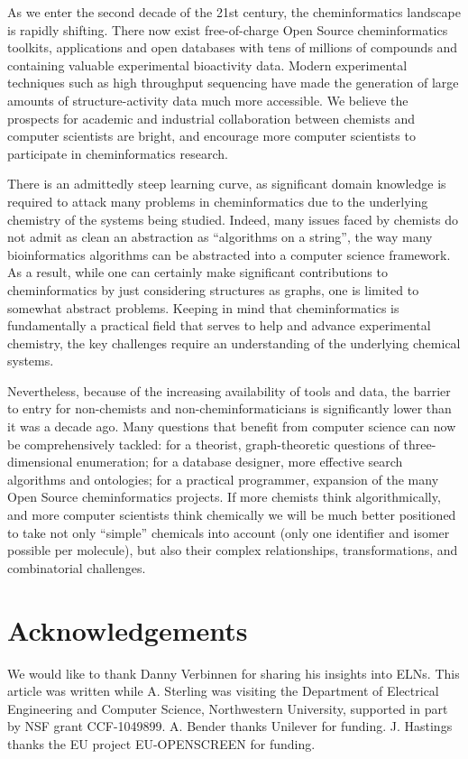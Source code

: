 \documentclass{sig-alternate}
\begin{document}
As we enter the second decade of the 21st century, the cheminformatics
landscape is rapidly shifting.  There now exist free-of-charge Open
Source cheminformatics toolkits, applications and open databases with
tens of millions of compounds and containing valuable experimental
bioactivity data. Modern experimental techniques such as high
throughput sequencing have made the generation of large amounts of
structure-activity data much more accessible.  We believe the
prospects for academic and industrial collaboration between chemists
and computer scientists are bright, and encourage more computer
scientists to participate in cheminformatics research.

There is an admittedly steep learning curve, as significant domain
knowledge is required to attack many problems in cheminformatics due
to the underlying chemistry of the systems being studied. Indeed, many
issues faced by chemists do not admit as clean an abstraction as
``algorithms on a string'', the way many bioinformatics algorithms can
be abstracted into a computer science framework.  As a result, while
one can certainly make significant contributions to cheminformatics by
just considering structures as graphs, one is limited to somewhat
abstract problems. Keeping in mind that cheminformatics is
fundamentally a practical field that serves to help and advance
experimental chemistry, the key challenges require an understanding of
the underlying chemical systems.

Nevertheless, because of the increasing availability of tools and
data, the barrier to entry for non-chemists and non-cheminformaticians
is significantly lower than it was a decade ago. Many questions that
benefit from computer science can now be comprehensively tackled: for
a theorist, graph-theoretic questions of three-dimensional
enumeration; for a database designer, more effective search algorithms
and ontologies; for a practical programmer, expansion of the many
Open Source cheminformatics projects.  If more chemists think
algorithmically, and more computer scientists think chemically we will be
much better positioned to take not only ``simple'' chemicals into
account (only one identifier and isomer possible per molecule), but
also their complex relationships, transformations, and combinatorial
challenges.

\section{Acknowledgements}
We would like to thank Danny Verbinnen for sharing his insights into
ELNs.  This article was written while A. Sterling was visiting the
Department of Electrical Engineering and Computer Science,
Northwestern University, supported in part by NSF grant
CCF-1049899. A. Bender thanks Unilever for funding. J. Hastings
thanks the EU project EU-OPENSCREEN for funding. 
\end{document}
